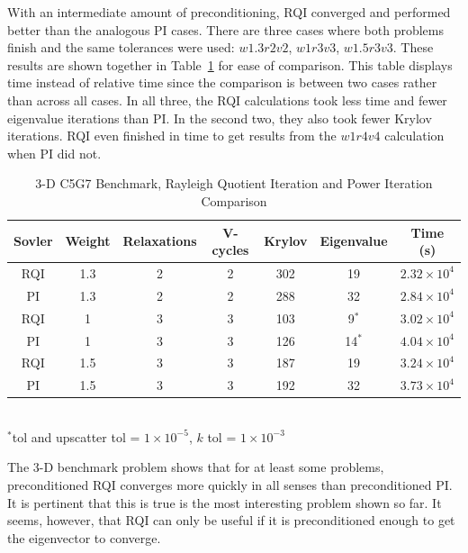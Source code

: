 \documentclass[preprint,12pt]{elsarticle}
\begin{document}
With an intermediate amount of preconditioning, RQI converged and performed better than the analogous PI cases. There are three cases where both problems finish and the same tolerances were used: $w1.3r2v2$, $w1r3v3$, $w1.5r3v3$. These results are shown together in Table~\ref{table:PI RQI} for ease of comparison. This table displays time instead of relative time since the comparison is between two cases rather than across all cases. In all three, the RQI calculations took less time and fewer eigenvalue iterations than PI. In the second two, they also took fewer Krylov iterations. RQI even finished in time to get results from the $w1r4v4$ calculation when PI did not. 
%
\begin{table}[!h]
\caption{3-D C5G7 Benchmark, Rayleigh Quotient Iteration and Power Iteration Comparison}
\begin{center}
\begin{tabular}{| c | c | c | c | c | c | c |}
\hline
Sovler & Weight & Relaxations & V-cycles & Krylov & Eigenvalue & Time (s) \\[0.5ex]
\hline
RQI & 1.3 & 2 & 2 & 302    & 19           & $2.32 \times 10^{4}$ \\
PI    & 1.3 & 2 & 2 & 288    & 32           & $2.84 \times 10^{4}$ \\
\hline
RQI & 1    & 3 & 3 & 103    & 9$^{*}$   & $3.02 \times 10^{4}$ \\
PI    & 1    & 3 & 3 & 126    & 14$^{*}$ & $4.04 \times 10^{4}$ \\
\hline
RQI & 1.5 & 3 & 3 & 187    & 19           & $3.24 \times 10^{4}$ \\
PI    & 1.5 & 3 & 3 & 192    & 32           & $3.73 \times 10^{4}$ \\
\hline 
\end{tabular}\\
$^{*}$tol and upscatter tol = $1 \times 10^{-5}$, $k$ tol = $1 \times 10^{-3}$
\end{center}
\label{table:PI RQI}
\end{table}  

The 3-D benchmark problem shows that for at least some problems, preconditioned RQI converges more quickly in all senses than preconditioned PI. It is pertinent that this is true is the most interesting problem shown so far. It seems, however, that RQI can only be useful if it is preconditioned enough to get the eigenvector to converge. 
%
%
\end{document}
